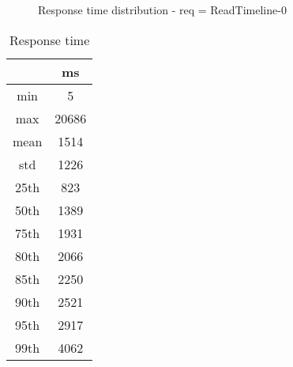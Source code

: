 \begin{minipage}{0.75\linewidth}
\begin{figure}[h]
\begin{adjustbox}{max width=1.0\linewidth, keepaspectratio}
  \end{adjustbox}
  \caption{Response time distribution - req = ReadTimeline-0}
\end{figure}
\end{minipage}\hfill\begin{minipage}{0.18\linewidth}
\begin{table}[h]
\begin{tabular}{|cc|}
\hline
\textbf{} & \textbf{ms}\\ \hline
 \Xhline{0.005\arrayrulewidth}
min & 5\\
 \Xhline{0.005\arrayrulewidth}
max & 20686\\
 \Xhline{0.005\arrayrulewidth}
mean & 1514\\
 \Xhline{0.005\arrayrulewidth}
std & 1226\\
\hline
\hline
 \Xhline{0.005\arrayrulewidth}
25th & 823\\
 \Xhline{0.005\arrayrulewidth}
50th & 1389\\
 \Xhline{0.005\arrayrulewidth}
75th & 1931\\
 \Xhline{0.005\arrayrulewidth}
80th & 2066\\
 \Xhline{0.005\arrayrulewidth}
85th & 2250\\
 \Xhline{0.005\arrayrulewidth}
90th & 2521\\
 \Xhline{0.005\arrayrulewidth}
95th & 2917\\
 \Xhline{0.005\arrayrulewidth}
99th & 4062\\
\hline
\end{tabular}
\caption{Response time}
\end{table}
\end{minipage}\hfill